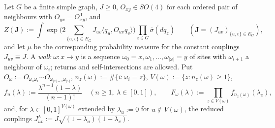 \documentclass[11pt,a4paper]{article}
\theoremstyle{plain}
\theoremstyle{remark}
\numberwithin{equation}{section}
\newcommand{\bs}{\boldsymbol}
\begin{document}
Let $G$ be a finite simple graph, $J\ge0$, $O_{xy}\in SO(4)$ for each ordered pair of neighbours with $O_{yx}=O_{xy}^{\mathsf T}$, and
\[
Z(\bs J):=\int\exp\Big(2\sum_{\{u,v\}\in E_G}J_{uv}\langle q_u,O_{uv}q_v\rangle\Big)\prod_{z\in G}\bar\sigma(dq_z)
\qquad(\bs J=(J_{uv})_{\{u,v\}\in E_G}),
\]
and let $\mu$ be the corresponding probability measure for the constant couplings $J_{uv}\equiv J$.
A \emph{walk} $\omega:x\to y$ is a sequence $\omega_0=x,\omega_1,\dots,\omega_{|\omega|}=y$ of sites with $\omega_{i+1}$ a neighbour
of $\omega_i$; returns and self-intersections are allowed. Put $O_\omega:=O_{\omega_0\omega_1}\cdots O_{\omega_{|\omega|-1}
\omega_{|\omega|}}$, $n_z(\omega):=\#\{i:\omega_i=z\}$, $V(\omega):=\{z:n_z(\omega)\ge1\}$,
\begin{equation}\label{eq:fn}
f_n(\lambda):=\frac{\lambda^{n-1}(1-\lambda)}{(n-1)!}\quad(n\ge1,\ \lambda\in[0,1]),\qquad F_\omega(\lambda):=\prod_{z\in V(\omega)}
f_{n_z(\omega)}(\lambda_z),
\end{equation}
and, for $\lambda\in[0,1]^{V(\omega)}$ extended by $\lambda_u:=0$ for $u\notin V(\omega)$, the reduced couplings
$J^\lambda_{uv}:=J\sqrt{(1-\lambda_u)(1-\lambda_v)}$.
\end{document}
